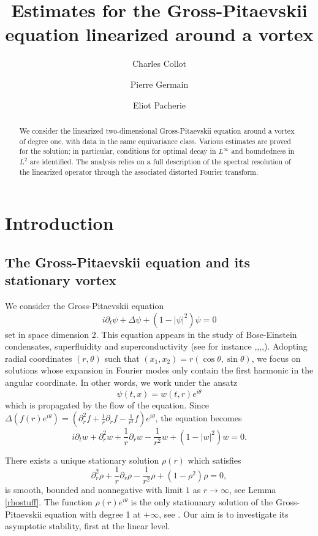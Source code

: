 \documentclass[11 pt]{amsart}
\title{Estimates for the Gross-Pitaevskii equation linearized around a vortex}
\author{Charles Collot}
\author{Pierre Germain}
\author{Eliot Pacherie}
\theoremstyle{definition}
\theoremstyle{remark}
\numberwithin{equation}{section}
\begin{document}
\begin{abstract}
We consider the linearized  two-dimensional Gross-Pitaevskii equation around a vortex of degree one, with data in the same equivariance class. Various estimates are proved for the solution; in particular, conditions for optimal decay in $L^\infty$ and boundedness in $L^2$ are identified. The analysis relies on a full description of the spectral resolution of the linearized operator through the associated distorted Fourier transform.
\end{abstract}

\maketitle


\tableofcontents

\section{Introduction}

\subsection{The Gross-Pitaevskii equation and its stationary vortex}
We consider the Gross-Pitaevskii equation
\begin{equation}
\label{GP} \tag{GP}
i \partial_t \psi + \Delta \psi + (1 - |\psi|^2) \psi = 0
\end{equation}
set in space dimension 2. This equation appears in the study of Bose-Einstein condensates, superfluidity and superconductivity (see for instance \cite{AbidHueMetNoreBra},\cite{Ginz-Pit_58a},\cite{KL},\cite{Neu_90},\cite{Pismen}). Adopting radial coordinates $(r,\theta)$ such that $(x_1 , x_2) = r (\cos \theta, \sin \theta)$, we focus on solutions whose expansion in Fourier modes only contain the first harmonic in the angular coordinate. In other words, we work under the ansatz
$$
\psi(t,x) = w(t,r) e^{i\theta}
$$
which is propagated by the flow of the equation.
Since $\Delta(f(r) e^{i\theta}) = \left( \partial_r^2 f + \frac{1}{r} \partial_r f - \frac {1}{r^2} f\right) e^{i\theta}$, the equation becomes
$$
i \partial_t w + \partial_r^2 w + \frac{1}{r} \partial_r w - \frac{1}{r^2} w + (1-|w|^2) w = 0.
$$

There exists a unique stationary solution $\rho(r)$ which satisfies
$$
\partial_r^2 \rho + \frac{1}{r} \partial_r \rho - \frac{1}{r^2} \rho + (1-\rho^2) \rho = 0,
$$
is smooth, bounded and nonnegative with limit $1$ as $r\to \infty$, see Lemma \ref{rhostuff}. The function $\rho(r) e^{i \theta}$ is the only stationnary solution of the Gross-Pitaevskii equation with degree 1 at $+\infty$, see \cite{Mironescu1996LesML}. Our aim is to investigate its asymptotic stability, first at the linear level.
\end{document}
